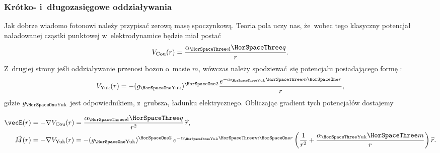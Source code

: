 \documentclass[10pt,t]{beamer}
\begin{document}
\begin{frame}
  \frametitle{Krótko- i~długozasięgowe oddziaływania}


  Jak dobrze wiadomo fotonowi należy przypisać zerową masę spoczynkową.
  Teoria pola uczy nas, że~wobec tego \alert{klasyczny} potencjał
  naładowanej cząstki punktowej w~elektrodynamice będzie miał postać
  \begin{equation}
    \label{eq:Czym-sa-problemy-ETC-03}
    V_{ \text{Cou} }( r ) =
    \frac{ \alpha_{ \HorSpaceThree \text{el} } \HorSpaceThree q }{ r }.
  \end{equation}
  Z~drugiej strony jeśli oddziaływanie przenosi bozon o~masie $m$, wówczas
  należy spodziewać~się potencjału posiadającego formę
  :
  \begin{equation}
    \label{eq:Czym-sa-problemy-ETC-03}
    V_{ \text{Yuk} }( r ) =
    -( g_{ \HorSpaceOne \text{Yuk} } )^{ \HorSpaceOne 2 }
    \frac{ e^{ -\alpha_{ \HorSpaceThree \text{Yuk} } \HorSpaceThree m \HorSpaceOne r } }
    { r },
  \end{equation}
  gdzie $g_{ \HorSpaceOne \text{Yuk} }$ jest odpowiednikiem, z~grubsza, ładunku
  elektrycznego. Obliczając gradient tych potencjałów dostajemy

  \vspace{-1.5em}


  \begin{subequations}

    \begin{align}
      \label{eq:Czym-sa-problemy-ETC-03}
      \vecE( r )
      &= -\nabla V_{ \text{Cou} }( r ) =
        \frac{ \alpha_{ \HorSpaceThree \text{el} } \HorSpaceThree q }{ r^{ 2 } } \,
        \widehat{ r }, \\
      \vec{ M }( r )
      &=
        -\nabla V_{ \text{Yuk} }( r ) =
        -( g_{ \HorSpaceOne \text{Yuk} } )^{ \HorSpaceOne 2 } \,
        e^{ -\alpha_{ \HorSpaceThree \text{Yuk} } \HorSpaceThree m \HorSpaceOne r }
        \left( \frac{ 1 }{ r^{ 2 } } +
        \frac{ \alpha_{ \HorSpaceThree \text{Yuk} } \HorSpaceThree m }{ r } \right)
        \widehat{ r }.
    \end{align}

  \end{subequations}

\end{frame}
\end{document}
